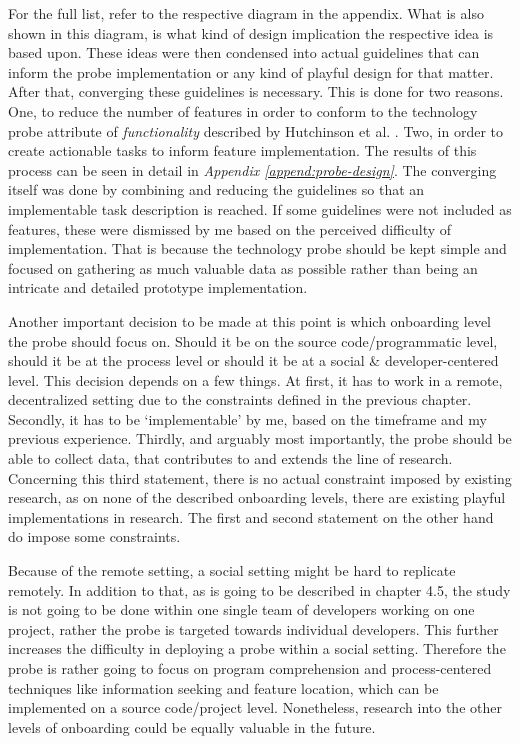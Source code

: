 For the full list, refer to the respective diagram in the appendix. What is also shown in this diagram, is what kind of design implication the respective idea is based upon. These ideas were then condensed into actual guidelines that can inform the probe implementation or any kind of playful design for that matter. After that, converging these guidelines is necessary. This is done for two reasons. One, to reduce the number of features in order to conform to the technology probe attribute of \textit{functionality} described by Hutchinson et al. \cite[p. 18]{hutchinson2003technology}. Two, in order to create actionable tasks to inform feature implementation. The results of this process can be seen in detail in \textit{Appendix \ref{append:probe-design}}. The converging itself was done by combining and reducing the guidelines so that an implementable task description is reached. If some guidelines were not included as features, these were dismissed by me based on the perceived difficulty of implementation. That is because the technology probe should be kept simple and focused on gathering as much valuable data as possible rather than being an intricate and detailed prototype implementation.

Another important decision to be made at this point is which onboarding level the probe should focus on. Should it be on the source code/programmatic level, should it be at the process level or should it be at a social \& developer-centered level. This decision depends on a few things. At first, it has to work in a remote, decentralized setting due to the constraints defined in the previous chapter. Secondly, it has to be \enquote*{implementable} by me, based on the timeframe and my previous experience. Thirdly, and arguably most importantly, the probe should be able to collect data, that contributes to and extends the line of research. Concerning this third statement, there is no actual constraint imposed by existing research, as on none of the described onboarding levels, there are existing playful implementations in research. The first and second statement on the other hand do impose some constraints.

Because of the remote setting, a social setting might be hard to replicate remotely. In addition to that, as is going to be described in chapter 4.5, the study is not going to be done within one single team of developers working on one project, rather the probe is targeted towards individual developers. This further increases the difficulty in deploying a probe within a social setting. Therefore the probe is rather going to focus on program comprehension and process-centered techniques like information seeking and feature location, which can be implemented on a source code/project level. Nonetheless, research into the other levels of onboarding could be equally valuable in the future.

